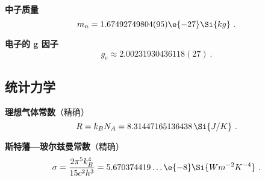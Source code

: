 \textbf{中子质量}
\begin{equation}
m_n = 1.67492749804(95)\e{-27}\Si{kg}~.
\end{equation}

\textbf{电子的 g 因子}
\begin{equation}
g_e \approx 2.00231930436118(27)~.
\end{equation}

\subsection{统计力学}

\textbf{理想气体常数}（精确）
\begin{equation}
R = k_B N_A = 8.31447165136438 \,\Si{J/K}~.
\end{equation}

\textbf{斯特藩—玻尔兹曼常数}（精确）
\begin{equation}
\sigma = \frac{2\pi^5k_B^4}{15c^2h^3} = 5.670374419\dots\e{-8} \Si{Wm^{-2}K^{-4}}~.
\end{equation}
